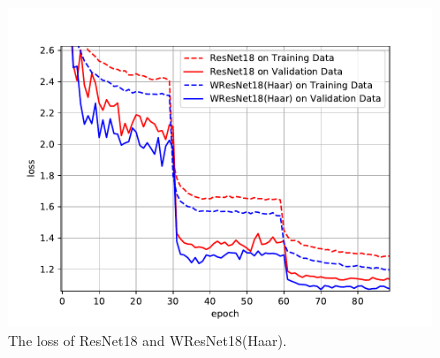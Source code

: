 \documentclass[10pt,twocolumn,letterpaper]{article}
\begin{document}
\begin{figure}[!bpt]
	\centering
	\includegraphics*[scale=0.55, viewport=21 2 417 305]{figures/resnet18_loss.pdf}
	\caption{The loss of ResNet18 and WResNet18(Haar).}
	\label{fig_loss_resnet18}
\end{figure}
\end{document}

